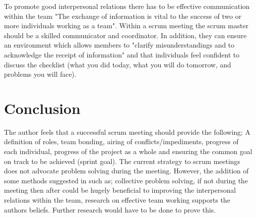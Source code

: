 \documentclass{scrartcl}
\begin{document}
To promote good interpersonal relations there has to be effective communication within the team "The exchange of information is vital to the success of two or more individuals working as a team"\cite [p. 559]{fletcher2006effects}. Within a scrum meeting the scrum master should be a skilled communicator and coordinator. In addition, they can ensure an environment which allows members to "clarify misunderstandings and to acknowledge the receipt of information" \cite [p. 559]{fletcher2006effects} and that individuals feel confident to discuss the checklist (what you did today, what you will do tomorrow, and problems you will face). 


\section{Conclusion}
The author feels that a successful scrum meeting should provide the following; A definition of roles, team bonding, airing of conflicts/impediments, progress of each individual, progress of the project as a whole and ensuring the common goal on track to be achieved (sprint goal).  The current strategy to scrum meetings does not advocate problem solving during the meeting. However, the addition of some methods suggested in  \cite{LeadershipLesson} such as; collective problem solving, if not during the meeting then after could be hugely beneficial to improving the interpersonal relations within the team, research on effective team working supports the authors beliefs. Further research would have to be done to prove this.



\end{document}
